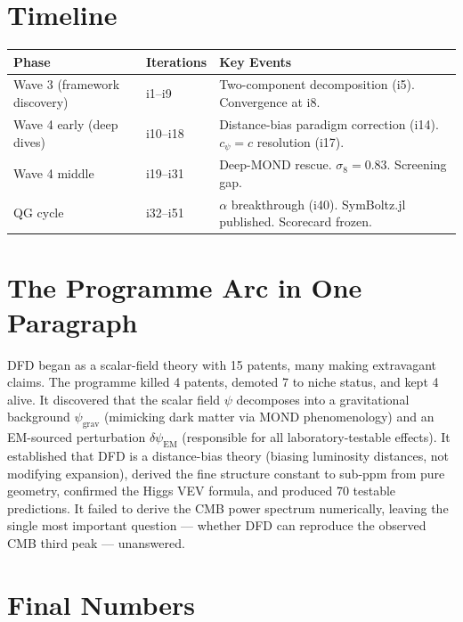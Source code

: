 \documentclass[11pt,a4paper]{article}
\begin{document}
\section{Timeline}

\begin{center}
\begin{tabular}{lll}
\toprule
\textbf{Phase} & \textbf{Iterations} & \textbf{Key Events} \\
\midrule
Wave 3 (framework discovery) & i1--i9 & Two-component decomposition (i5). Convergence at i8. \\
Wave 4 early (deep dives) & i10--i18 & Distance-bias paradigm correction (i14). $c_\psi = c$ resolution (i17). \\
Wave 4 middle & i19--i31 & Deep-MOND rescue. $\sigma_8 = 0.83$. Screening gap. \\
QG cycle & i32--i51 & $\alpha$ breakthrough (i40). SymBoltz.jl published. Scorecard frozen. \\
\bottomrule
\end{tabular}
\end{center}

\section{The Programme Arc in One Paragraph}

DFD began as a scalar-field theory with 15 patents, many making extravagant claims. The programme killed 4 patents, demoted 7 to niche status, and kept 4 alive. It discovered that the scalar field $\psi$ decomposes into a gravitational background $\psi_\text{grav}$ (mimicking dark matter via MOND phenomenology) and an EM-sourced perturbation $\delta\psi_\text{EM}$ (responsible for all laboratory-testable effects). It established that DFD is a distance-bias theory (biasing luminosity distances, not modifying expansion), derived the fine structure constant to sub-ppm from pure geometry, confirmed the Higgs VEV formula, and produced 70 testable predictions. It failed to derive the CMB power spectrum numerically, leaving the single most important question --- whether DFD can reproduce the observed CMB third peak --- unanswered.

\section{Final Numbers}
\end{document}
